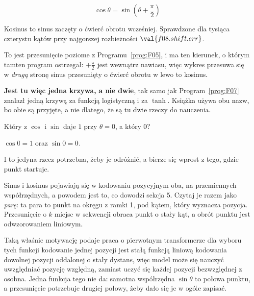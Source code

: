 \begin{fr}
\begin{ansblock}
\[ \cos\theta = \sin\!\left(\theta + \frac{\pi}{2}\right) \]
\end{ansblock}

Kosinus to sinus zaczęty o ćwierć obrotu wcześniej. Sprawdzone dla tysiąca
czterystu kątów przy najgorszej rozbieżności $\val{f08.shift.err}$.

To jest przesunięcie poziome z Programu~\ref{prog:F05}, i ma ten kierunek, o
którym tamten program ostrzegał: $+\frac{\pi}{2}$ jest wewnątrz nawiasu, więc
wykres przesuwa się w \emph{drugą} stronę \dash{} sinus przesunięty o ćwierć
obrotu w lewo to kosinus.

\textbf{Jest tu więc jedna krzywa, a nie dwie}, tak samo jak
Program~\ref{prog:F07} znalazł jedną krzywą za funkcją logistyczną i za
$\tanh$. Książka używa obu nazw, bo obie są przyjęte, a nie dlatego, że są tu
dwie rzeczy do nauczenia.

Który z $\cos$ i $\sin$ daje $1$ przy $\theta = 0$, a który $0$?
\nextframe
\end{fr}

\begin{fr}
\begin{ansblock}
$\cos 0 = 1$ oraz $\sin 0 = 0$.
\end{ansblock}

I to jedyna rzecz potrzebna, żeby je odróżnić, a bierze się wprost z tego,
gdzie punkt startuje.

\begin{aibox}
Sinus i kosinus pojawiają się w kodowaniu pozycyjnym oba, na przemiennych
współrzędnych, a powodem jest to, co dowodzi sekcja 5. Czytaj je razem jako
\emph{parę}: ta para to punkt na okręgu z ramki 1, pod kątem, który wyznacza
pozycja. Przesunięcie o $k$ miejsc w sekwencji obraca punkt o stały kąt, a
obrót punktu jest odwzorowaniem liniowym.

Taką właśnie motywację podaje praca o pierwotnym transformerze dla wyboru tych
funkcji \dash{} kodowanie jednej pozycji jest stałą funkcją liniową kodowania
dowolnej pozycji oddalonej o stały dystans, więc model może się nauczyć
uwzględniać pozycję względną, zamiast uczyć się każdej pozycji bezwzględnej z
osobna. Jedna funkcja tego nie da: samotna współrzędna $\sin\theta$ to połowa
punktu, a przesunięcie potrzebuje drugiej połowy, żeby dało się je w ogóle
zapisać.
\end{aibox}
\end{fr}

